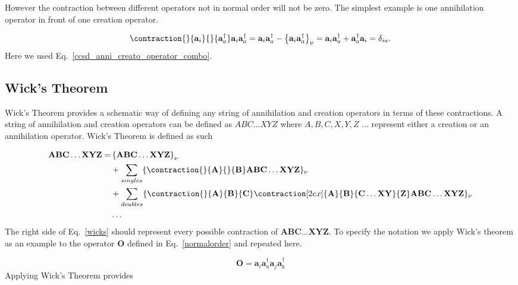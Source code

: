 \documentclass[graybox,sectrefs,envcountresetchap,open=right]{svmonodo}
\begin{document}
However the contraction between different operators not in normal order will not be zero. The simplest example is one annihilation operator in front of one creation operator.

\begin{equation}
\contraction{}{\mathbf{a}_i}{}{\mathbf{a}^{\dagger}_a}
\mathbf{a}_i\mathbf{a}^{\dagger}_a
= \mathbf{a}_i \mathbf{a}^{\dagger}_a - \left\{ \mathbf{a}_i \mathbf{a}^{\dagger}_a \right\}_{\nu} = \mathbf{a}_i \mathbf{a}^{\dagger}_a + \mathbf{a}^{\dagger}_a \mathbf{a}_i = \delta_{ia} .
\end{equation} 
Here we used Eq.~\ref{ccsd_anni_creato_operator_combo}.

\subsection{Wick's Theorem}
Wick's Theorem provides a schematic way of defining any string of annihilation and creation operators in terms of these contractions. A string of annihilation and creation operators can be defined as $ABC \dots XYZ$ where $A, B, C, X, Y, Z$ $\dots$ represent either a creation or an annihilation operator.  Wick's Theorem is defined as such

\begin{align}
\mathbf{A} \mathbf{B} \mathbf{C} \dots \mathbf{X} \mathbf{Y} \mathbf{Z} = & \left\{\mathbf{A} \mathbf{B} \mathbf{C} \dots \mathbf{X} \mathbf{Y} \mathbf{Z} \right\}_{\nu} \label{wicks} \\
& + \sum_{singles} \{
\contraction{}{\mathbf{A}}{}{\mathbf{B}}
\mathbf{A}\mathbf{B}
\mathbf{C} \dots \mathbf{X} \mathbf{Y} \mathbf{Z}
\}_{\nu} \nonumber \\
& + \sum_{doubles} \{
\contraction{}{\mathbf{A}}{\mathbf{B}}{\mathbf{C}}
\contraction[2ex]{\mathbf{A}}{\mathbf{B}}{\mathbf{C} \dots \mathbf{X} \mathbf{Y}}{\mathbf{Z}}
\mathbf{A} \mathbf{B} \mathbf{C} \dots \mathbf{X} \mathbf{Y} \mathbf{Z} 
\}_{\nu} \nonumber \\
& \dots \nonumber
\end{align} 
The right side of Eq.~\ref{wicks} should represent every possible contraction of $\mathbf{A} \mathbf{B} \mathbf{C} \dots \mathbf{X} \mathbf{Y} \mathbf{Z}$. To specify the notation we apply Wick's theorem as an example to the operator $\mathbf{O}$ defined in Eq.~\ref{normalorder} and repeated here.

\begin{equation}
\mathbf{O} = \mathbf{a}_i \mathbf{a}^{\dagger}_a \mathbf{a}_j \mathbf{a}^{\dagger}_b \nonumber
\end{equation} 
Applying Wick's Theorem provides
\end{document}
